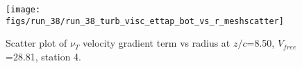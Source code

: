 \begin{figure}[H]
\centering
\texttt{[image: figs/run\_38/run\_38\_turb\_visc\_ettap\_bot\_vs\_r\_meshscatter]}
\caption{Scatter plot of $\nu_T$ velocity gradient term vs radius at $z/c$=8.50, $V_{free}$=28.81, station 4.}
\label{fig:run_38_turb_visc_ettap_bot_vs_r_meshscatter}
\end{figure}


